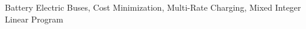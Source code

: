 \begin{abstract}
\end{abstract}
\begin{IEEEkeywords}
	Battery Electric Buses, Cost Minimization, Multi-Rate Charging, Mixed Integer Linear Program
\end{IEEEkeywords}




